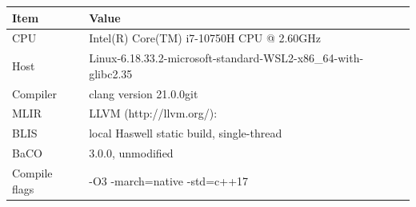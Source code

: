\begin{tabular}{ll}
\toprule
Item & Value \\
\midrule
CPU & Intel(R) Core(TM) i7-10750H CPU @ 2.60GHz \\
Host & Linux-6.18.33.2-microsoft-standard-WSL2-x86\_64-with-glibc2.35 \\
Compiler & clang version 21.0.0git \\
MLIR & LLVM (http://llvm.org/): \\
BLIS & local Haswell static build, single-thread \\
BaCO & 3.0.0, unmodified \\
Compile flags & -O3 -march=native -std=c++17 \\
\bottomrule
\end{tabular}
